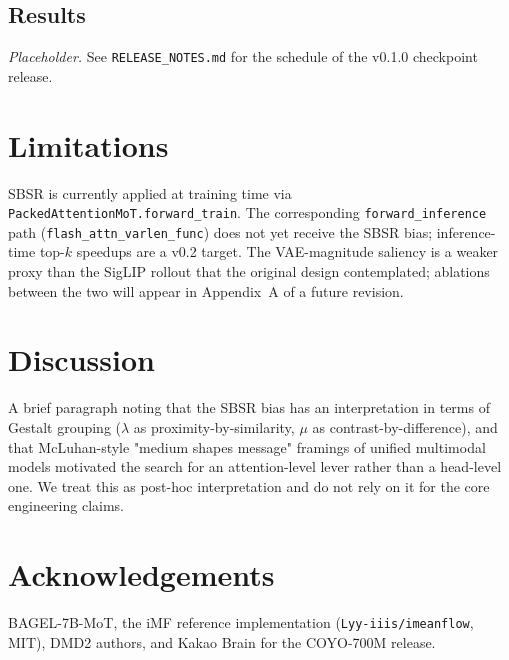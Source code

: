 \documentclass[10pt,letterpaper]{article}
\begin{document}
\subsection{Results}
\emph{Placeholder.} See \texttt{RELEASE\_NOTES.md} for the schedule of
the v0.1.0 checkpoint release.

\section{Limitations}
SBSR is currently applied at training time via
\texttt{PackedAttentionMoT.forward\_train}. The corresponding
\texttt{forward\_inference} path (\texttt{flash\_attn\_varlen\_func})
does not yet receive the SBSR bias; inference-time top-$k$ speedups are
a v0.2 target. The VAE-magnitude saliency is a weaker proxy than the
SigLIP rollout that the original design contemplated; ablations between
the two will appear in Appendix~A of a future revision.

\section{Discussion}
A brief paragraph noting that the SBSR bias has an interpretation in
terms of Gestalt grouping ($\lambda$ as proximity-by-similarity,
$\mu$ as contrast-by-difference), and that McLuhan-style "medium
shapes message" framings of unified multimodal models motivated the
search for an attention-level lever rather than a head-level one. We
treat this as post-hoc interpretation and do not rely on it for the
core engineering claims.

\section*{Acknowledgements}
BAGEL-7B-MoT, the iMF reference implementation
(\texttt{Lyy-iiis/imeanflow}, MIT), DMD2 authors, and Kakao Brain for
the COYO-700M release.
\end{document}
